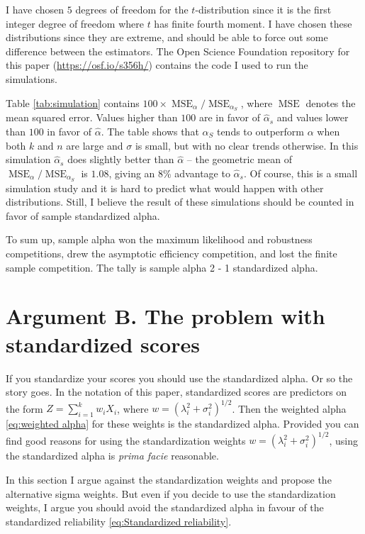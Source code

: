 \documentclass[twoside]{article}
\DeclareMathOperator{\MSE}{MSE}
\DeclareMathOperator{\tsum}{\textstyle \sum}
\begin{document}
I have chosen $5$ degrees of freedom for the $t$-distribution since it is the first integer degree of freedom where $t$ has finite fourth moment. %
I have chosen these distributions since they are extreme, and should be able to force out some difference between the estimators. The Open Science Foundation repository for this paper (\url{https://osf.io/s356h/}) contains the code I used to run the simulations.

Table \ref{tab:simulation} contains $100 \times \MSE_\alpha/\MSE_{\alpha_S}$, where $\MSE$ denotes the mean squared error. Values higher than $100$ are in favor of $\hat{\alpha}_s$ and values lower than $100$ in favor of $\hat{\alpha}$. The table shows that $\alpha_S$ tends to outperform $\alpha$ when both $k$ and $n$ are large and $\sigma$ is small, but with no clear trends otherwise. In this simulation $\hat{\alpha}_s$ does slightly better than $\hat{\alpha}$ -- the geometric mean of $\MSE_\alpha/\MSE_{\alpha_S}$ is $1.08$, giving an $8$\% advantage to $\hat{\alpha}_s$. Of course, this is a small simulation study and it is hard to predict what would happen with other distributions. Still, I believe the result of these simulations should be counted in favor of sample standardized alpha.

To sum up, sample alpha won the maximum likelihood and robustness competitions, drew the asymptotic efficiency competition, and lost the finite sample competition. The tally is sample alpha 2 - 1 standardized alpha. 



\section{Argument B. The problem with standardized scores}
\label{sec:argument B}
If you standardize your scores you should use the standardized alpha. Or so the story goes. In the notation of this paper, standardized scores are predictors on the form $\hat{Z} = \tsum_{i=1}^k w_iX_i$, where $w=(\lambda_i^2 + \sigma_i^2)^{1/2}$. Then the weighted alpha \eqref{eq:weighted alpha} for these weights is the standardized alpha. Provided you can find good reasons for using the standardization weights $w=(\lambda_i^2 + \sigma_i^2)^{1/2}$, using the standardized alpha is \textit{prima facie} reasonable.

In this section I argue against the standardization weights and propose the alternative sigma weights. But even if you decide to use the standardization weights, I argue you should avoid the standardized alpha in favour of the standardized reliability \eqref{eq:Standardized reliability}. 
\end{document}
